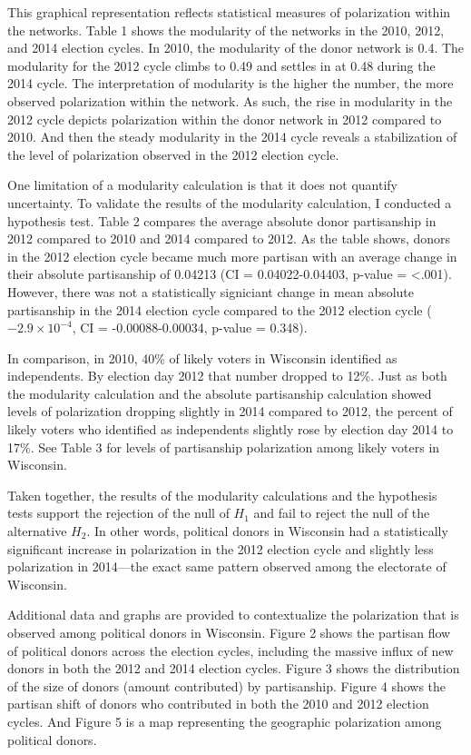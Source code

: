 \documentclass[12pt,]{article}
\begin{document}
This graphical representation reflects statistical measures of
polarization within the networks. Table 1 shows the modularity of the
networks in the 2010, 2012, and 2014 election cycles. In 2010, the
modularity of the donor network is 0.4. The modularity for the 2012
cycle climbs to 0.49 and settles in at 0.48 during the 2014 cycle. The
interpretation of modularity is the higher the number, the more observed
polarization within the network. As such, the rise in modularity in the
2012 cycle depicts polarization within the donor network in 2012
compared to 2010. And then the steady modularity in the 2014 cycle
reveals a stabilization of the level of polarization observed in the
2012 election cycle.

One limitation of a modularity calculation is that it does not quantify
uncertainty. To validate the results of the modularity calculation, I
conducted a hypothesis test. Table 2 compares the average absolute donor
partisanship in 2012 compared to 2010 and 2014 compared to 2012. As the
table shows, donors in the 2012 election cycle became much more partisan
with an average change in their absolute partisanship of 0.04213 (CI =
0.04022-0.04403, p-value = \textless.001). However, there was not a
statistically signiciant change in mean absolute partisanship in the
2014 election cycle compared to the 2012 election cycle
(\ensuremath{-2.9\times 10^{-4}}, CI = -0.00088-0.00034, p-value =
0.348).

In comparison, in 2010, 40\% of likely voters in Wisconsin identified as
independents. By election day 2012 that number dropped to 12\%. Just as
both the modularity calculation and the absolute partisanship
calculation showed levels of polarization dropping slightly in 2014
compared to 2012, the percent of likely voters who identified as
independents slightly rose by election day 2014 to 17\%. See Table 3 for
levels of partisanship polarization among likely voters in Wisconsin.

Taken together, the results of the modularity calculations and the
hypothesis tests support the rejection of the null of \(H_{1}\) and fail
to reject the null of the alternative \(H_{2}\). In other words,
political donors in Wisconsin had a statistically significant increase
in polarization in the 2012 election cycle and slightly less
polarization in 2014---the exact same pattern observed among the
electorate of Wisconsin.

Additional data and graphs are provided to contextualize the
polarization that is observed among political donors in Wisconsin.
Figure 2 shows the partisan flow of political donors across the election
cycles, including the massive influx of new donors in both the 2012 and
2014 election cycles. Figure 3 shows the distribution of the size of
donors (amount contributed) by partisanship. Figure 4 shows the partisan
shift of donors who contributed in both the 2010 and 2012 election
cycles. And Figure 5 is a map representing the geographic polarization
among political donors.
\end{document}
